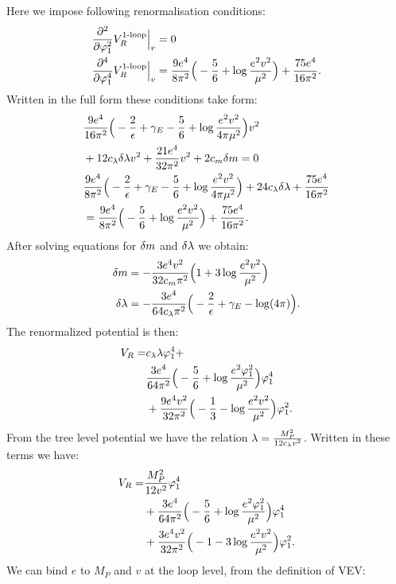 Here we impose following renormalisation conditions:
\begin{align}
\frac{\partial^2 }{\partial \varphi_1^2}V_R^{\textrm{1-loop}}\Big|_{v} &= 0 \\
\frac{\partial^4 }{\partial \varphi_1^4}V_R^{\textrm{1-loop}}\Big|_{v} &= \frac{9e^4}{8\pi^2}\Big(-\frac{5}{6}+\log\frac{e^2
v^2}{\mu^2}\Big)
+\frac{75e^4}{16\pi^2}.
\end{align}
Written in the full form these conditions take form:
\begin{align}
&\frac{9e^4}{16\pi^2}\Big(-\frac{2}{\epsilon}+\gamma_E-\frac{5}{6}+\log\frac{e^2
v^2}{4\pi\mu^2}\Big)v^2 \notag\\
&+ 12c_\lambda\delta\lambda v^2+\frac{21e^4}{32\pi^2}v^2+2c_m\delta m = 0 \\
&\frac{9e^4}{8\pi^2}\Big(-\frac{2}{\epsilon}+\gamma_E-\frac{5}{6}+\log\frac{e^2v^2}{4\pi\mu^2}\Big)+
24c_\lambda\delta\lambda+\frac{75e^4}{16\pi^2}  \notag \\
&=\frac{9e^4}{8\pi^2}\Big(-\frac{5}{6}+\log\frac{e^2v^2}{\mu^2}\Big)+\frac{75e^4}{16\pi^2}.
\end{align}
After solving equations for $\delta m$ and $\delta\lambda$ we obtain:
\begin{align}
\delta m &= -\frac{3e^4v^2}{32c_m\pi^2}\Big(1+3
\log\frac{e^2v^2}{\mu^2}\Big) \\
\delta\lambda &= -\frac{3e^4}{64c_\lambda\pi^2}\Big(-\frac{2}{\epsilon}+\gamma_E-\log(4\pi)\Big).
\end{align}
The renormalized potential is then:
\begin{align}
V_R = &c_\lambda\lambda\varphi_1^4 + \notag \\ 
&\frac{3e^4}{64\pi^2}\Big(-\frac{5}{6}+\log\frac{e^2\varphi_1^2}{\mu^2}\Big)\varphi_1^4 \notag\\
&+\frac{9e^4v^2}{32\pi^2}\Big(-\frac{1}{3}-\log\frac{e^2v^2}{\mu^2}\Big)\varphi_1^2.
\end{align}
From the tree level potential we have the relation $\lambda = \frac{M_P^2}{12c_\lambda v^2}$. 
Written in these terms we have:
\begin{align}
V_R = &\frac{M_P^2}{12v^2}\varphi_1^4  \notag \\ 
&+\frac{3e^4}{64\pi^2}\Big(-\frac{5}{6}+\log\frac{e^2\varphi_1^2}{\mu^2}\Big)\varphi_1^4 \notag\\
&+\frac{3e^4v^2}{32\pi^2}\Big(-1-3\log\frac{e^2v^2}{\mu^2}\Big)\varphi_1^2.
\end{align}
We can bind $e$ to $M_P$ and $v$ at the loop level, from the definition of VEV:
